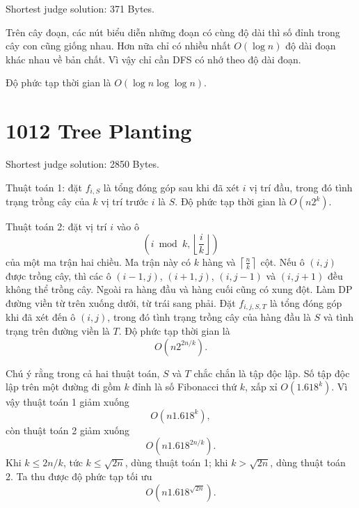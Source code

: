 \documentclass[11pt]{article}
\begin{document}
Shortest judge solution: 371 Bytes.

Trên cây đoạn, các nút biểu diễn những đoạn có cùng độ dài thì số đỉnh trong
cây con cũng giống nhau. Hơn nữa chỉ có nhiều nhất $O(\log n)$ độ dài đoạn
khác nhau về bản chất. Vì vậy chỉ cần DFS có nhớ theo độ dài đoạn.

Độ phức tạp thời gian là $O(\log n\log\log n)$.

\section{1012 Tree Planting}

Shortest judge solution: 2850 Bytes.

Thuật toán 1: đặt $f_{i,S}$ là tổng đóng góp sau khi đã xét $i$ vị trí đầu,
trong đó tình trạng trồng cây của $k$ vị trí trước $i$ là $S$. Độ phức tạp
thời gian là $O(n2^k)$.

Thuật toán 2: đặt vị trí $i$ vào ô
\[
  \left(i\bmod k,\left\lfloor\frac{i}{k}\right\rfloor\right)
\]
của một ma trận hai chiều. Ma trận này có $k$ hàng và $\left\lceil
\frac{n}{k}\right\rceil$ cột. Nếu ô $(i,j)$ được trồng cây, thì các ô
$(i-1,j)$, $(i+1,j)$, $(i,j-1)$ và $(i,j+1)$ đều không thể trồng cây. Ngoài
ra hàng đầu và hàng cuối cũng có xung đột. Làm DP đường viền từ trên xuống
dưới, từ trái sang phải. Đặt $f_{i,j,S,T}$ là tổng đóng góp khi đã xét đến ô
$(i,j)$, trong đó tình trạng trồng cây của hàng đầu là $S$ và tình trạng trên
đường viền là $T$. Độ phức tạp thời gian là
\[
  O\left(n2^{2n/k}\right).
\]

Chú ý rằng trong cả hai thuật toán, $S$ và $T$ chắc chắn là tập độc lập. Số
tập độc lập trên một đường đi gồm $k$ đỉnh là số Fibonacci thứ $k$, xấp xỉ
$O(1.618^k)$. Vì vậy thuật toán 1 giảm xuống
\[
  O(n1.618^k),
\]
còn thuật toán 2 giảm xuống
\[
  O\left(n1.618^{2n/k}\right).
\]
Khi $k\le 2n/k$, tức $k\le\sqrt{2n}$, dùng thuật toán 1; khi
$k>\sqrt{2n}$, dùng thuật toán 2. Ta thu được độ phức tạp tối ưu
\[
  O\left(n1.618^{\sqrt{2n}}\right).
\]
\end{document}
